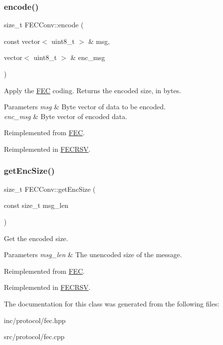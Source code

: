 \subsubsection{\texorpdfstring{encode()}{encode()}}
{\footnotesize\ttfamily size\+\_\+t F\+E\+C\+Conv\+::encode (\begin{DoxyParamCaption}\item[{const vector$<$ uint8\+\_\+t $>$ \&}]{msg,  }\item[{vector$<$ uint8\+\_\+t $>$ \&}]{enc\+\_\+msg }\end{DoxyParamCaption})\hspace{0.3cm}{\ttfamily [virtual]}}

Apply the \hyperlink{classFEC}{F\+EC} coding. Returns the encoded size, in bytes. 
\begin{DoxyParams}{Parameters}
{\em msg} & Byte vector of data to be encoded. \\
\hline
{\em enc\+\_\+msg} & Byte vector of encoded data. \\
\hline
\end{DoxyParams}


Reimplemented from \hyperlink{classFEC_abc86f45390c50b3cd90cade73a137355}{F\+EC}.



Reimplemented in \hyperlink{classFECRSV_ac9bd3fe4c494067e6f24a1287b0c562e}{F\+E\+C\+R\+SV}.

\mbox{\label{classFECConv_a3b49acf69440d2677e3181513b9f3592}} 
\subsubsection{\texorpdfstring{get\+Enc\+Size()}{getEncSize()}}
{\footnotesize\ttfamily size\+\_\+t F\+E\+C\+Conv\+::get\+Enc\+Size (\begin{DoxyParamCaption}\item[{const size\+\_\+t}]{msg\+\_\+len }\end{DoxyParamCaption})\hspace{0.3cm}{\ttfamily [virtual]}}

Get the encoded size. 
\begin{DoxyParams}{Parameters}
{\em msg\+\_\+len} & The unencoded size of the message. \\
\hline
\end{DoxyParams}


Reimplemented from \hyperlink{classFEC_a6504a5f7d5e1344538c25ed5481d0adb}{F\+EC}.



Reimplemented in \hyperlink{classFECRSV_a62fb01c152dad2e043ae75bbacfd928c}{F\+E\+C\+R\+SV}.



The documentation for this class was generated from the following files\+:\begin{DoxyCompactItemize}
\item 
inc/protocol/fec.\+hpp\item 
src/protocol/fec.\+cpp\end{DoxyCompactItemize}
